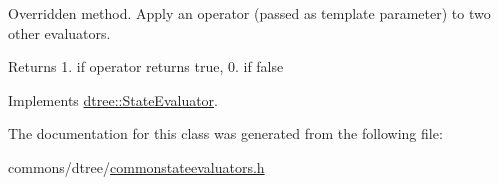 Overridden method. Apply an operator (passed as template parameter) to two other evaluators. 

\begin{DoxyReturn}{Returns}
1. if operator returns true, 0. if false 
\end{DoxyReturn}


Implements \mbox{\hyperlink{classdtree_1_1_state_evaluator_ab57666219fbdc728f40d9d5acd5726cb}{dtree\+::\+State\+Evaluator}}.



The documentation for this class was generated from the following file\+:\begin{DoxyCompactItemize}
\item 
commons/dtree/\mbox{\hyperlink{commonstateevaluators_8h}{commonstateevaluators.\+h}}\end{DoxyCompactItemize}
